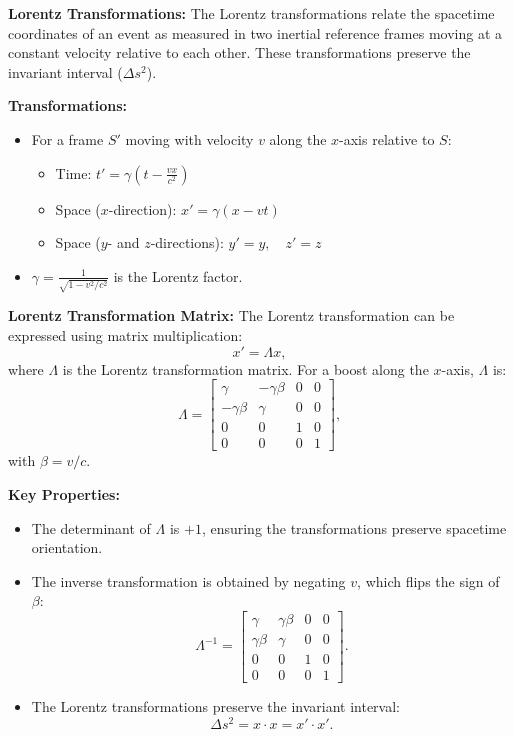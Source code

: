 \documentclass{article}
\newcommand{\conceptbox}[1]{\begin{tcolorbox}[colback=blue!10] #1 \end{tcolorbox}}
\begin{document}
\conceptbox{
\textbf{Lorentz Transformations:}
The Lorentz transformations relate the spacetime coordinates of an event as measured in two inertial reference frames moving at a constant velocity relative to each other. These transformations preserve the invariant interval (\( \Delta s^2 \)).

\textbf{Transformations:}
\begin{itemize}
    \item For a frame \( S' \) moving with velocity \( v \) along the \( x \)-axis relative to \( S \):
    \begin{itemize}
        \item Time: \( t' = \gamma \left( t - \frac{vx}{c^2} \right) \)
        \item Space (\( x \)-direction): \( x' = \gamma \left( x - vt \right) \)
        \item Space (\( y \)- and \( z \)-directions): \( y' = y, \quad z' = z \)
    \end{itemize}
    \item \( \gamma = \frac{1}{\sqrt{1 - v^2/c^2}} \) is the Lorentz factor.
\end{itemize}

\textbf{Lorentz Transformation Matrix:}
The Lorentz transformation can be expressed using matrix multiplication:
\[
x' = \Lambda x,
\]
where \( \Lambda \) is the Lorentz transformation matrix. For a boost along the \( x \)-axis, \( \Lambda \) is:
\[
\Lambda =
\begin{bmatrix}
\gamma & -\gamma \beta & 0 & 0 \\
-\gamma \beta & \gamma & 0 & 0 \\
0 & 0 & 1 & 0 \\
0 & 0 & 0 & 1
\end{bmatrix},
\]
with \( \beta = v/c \).

\textbf{Key Properties:}
\begin{itemize}
    \item The determinant of \( \Lambda \) is \( +1 \), ensuring the transformations preserve spacetime orientation.
    \item The inverse transformation is obtained by negating \( v \), which flips the sign of \( \beta \):
    \[
    \Lambda^{-1} = \begin{bmatrix}
    \gamma & \gamma \beta & 0 & 0 \\
    \gamma \beta & \gamma & 0 & 0 \\
    0 & 0 & 1 & 0 \\
    0 & 0 & 0 & 1
    \end{bmatrix}.
    \]
    \item The Lorentz transformations preserve the invariant interval:
    \[
    \Delta s^2 = x \cdot x = x'\cdot x'.
    \]
\end{itemize}

}
\end{document}
